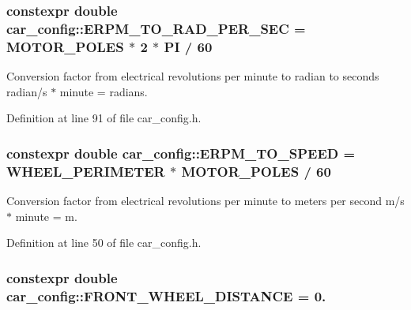 \subsubsection[{\texorpdfstring{E\+R\+P\+M\+\_\+\+T\+O\+\_\+\+R\+A\+D\+\_\+\+P\+E\+R\+\_\+\+S\+EC}{ERPM_TO_RAD_PER_SEC}}]{\setlength{\rightskip}{0pt plus 5cm}constexpr double car\+\_\+config\+::\+E\+R\+P\+M\+\_\+\+T\+O\+\_\+\+R\+A\+D\+\_\+\+P\+E\+R\+\_\+\+S\+EC = {\bf M\+O\+T\+O\+R\+\_\+\+P\+O\+L\+ES} $\ast$ 2 $\ast$ {\bf PI} / 60}\hypertarget{namespacecar__config_a877c4a772a47f4737d9f03fe8a22e106}{}\label{namespacecar__config_a877c4a772a47f4737d9f03fe8a22e106}


Conversion factor from electrical revolutions per minute to radian to seconds  radian/s $\ast$ minute = radians. 



Definition at line 91 of file car\+\_\+config.\+h.

\subsubsection[{\texorpdfstring{E\+R\+P\+M\+\_\+\+T\+O\+\_\+\+S\+P\+E\+ED}{ERPM_TO_SPEED}}]{\setlength{\rightskip}{0pt plus 5cm}constexpr double car\+\_\+config\+::\+E\+R\+P\+M\+\_\+\+T\+O\+\_\+\+S\+P\+E\+ED = {\bf W\+H\+E\+E\+L\+\_\+\+P\+E\+R\+I\+M\+E\+T\+ER} $\ast$ {\bf M\+O\+T\+O\+R\+\_\+\+P\+O\+L\+ES} / 60}\hypertarget{namespacecar__config_af33b95798967e7193927782fd91d36ce}{}\label{namespacecar__config_af33b95798967e7193927782fd91d36ce}


Conversion factor from electrical revolutions per minute to meters per second  m/s $\ast$ minute = m. 



Definition at line 50 of file car\+\_\+config.\+h.

\subsubsection[{\texorpdfstring{F\+R\+O\+N\+T\+\_\+\+W\+H\+E\+E\+L\+\_\+\+D\+I\+S\+T\+A\+N\+CE}{FRONT_WHEEL_DISTANCE}}]{\setlength{\rightskip}{0pt plus 5cm}constexpr double car\+\_\+config\+::\+F\+R\+O\+N\+T\+\_\+\+W\+H\+E\+E\+L\+\_\+\+D\+I\+S\+T\+A\+N\+CE = 0.}\hypertarget{namespacecar__config_a80d9d6f97a63ffcaba87b65a9e1e29e4}{}\label{namespacecar__config_a80d9d6f97a63ffcaba87b65a9e1e29e4}


